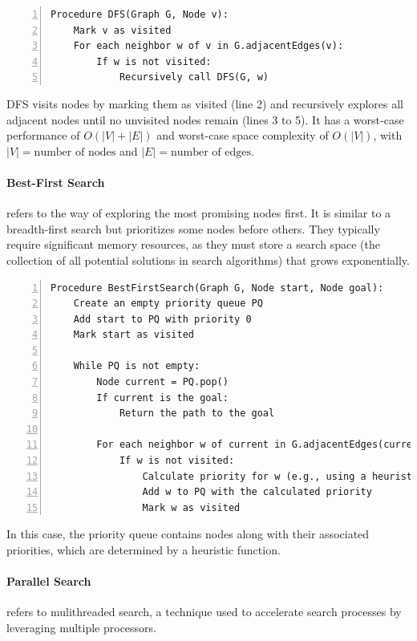 \begin{lstlisting}[caption={Pseudocode of the Depth-First Search algorithm.}, label={lst:dfs}, frame=single, numbers=left, xleftmargin=15pt]
Procedure DFS(Graph G, Node v):
    Mark v as visited
    For each neighbor w of v in G.adjacentEdges(v):
        If w is not visited:
            Recursively call DFS(G, w)
\end{lstlisting}

\noindent DFS visits nodes by marking them as visited (line 2) and recursively explores all adjacent nodes until no unvisited nodes remain (lines 3 to 5). It has a worst-case performance of $O(|V| + |E|)$ and worst-case space complexity of $O(|V|)$, with $|V| = \text{number of nodes}$ and $|E| = \text{number of edges}$.

\paragraph{Best-First Search} refers to the way of exploring the most promising nodes first. It is similar to a breadth-first search but prioritizes some nodes before others. They typically require significant memory resources, as they must store a search space (the collection of all potential solutions in search algorithms) that grows exponentially.

\vspace{1em}

\begin{lstlisting}[caption={Pseudocode of the Best-First Search algorithm.}, frame=single, numbers=left, xleftmargin=10pt, breaklines=true]
Procedure BestFirstSearch(Graph G, Node start, Node goal):
    Create an empty priority queue PQ
    Add start to PQ with priority 0
    Mark start as visited

    While PQ is not empty:
        Node current = PQ.pop()
        If current is the goal:
            Return the path to the goal

        For each neighbor w of current in G.adjacentEdges(current):
            If w is not visited:
                Calculate priority for w (e.g., using a heuristic)
                Add w to PQ with the calculated priority
                Mark w as visited
\end{lstlisting}

\noindent In this case, the priority queue contains nodes along with their associated priorities, which are determined by a heuristic function.

\paragraph{Parallel Search} refers to mulithreaded search, a technique used to accelerate search processes by leveraging multiple processors.

